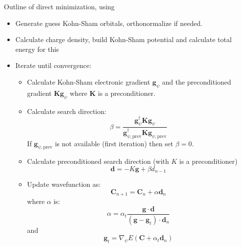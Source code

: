 Outline of direct minimization, using 
\begin{itemize}
\item Generate guess Kohn-Sham orbitals, orthonormalize if needed.
\item Calculate charge density, build Kohn-Sham potential and calculate total energy
for this
\item Iterate until convergence:
%
\begin{itemize}
%
\item Calculate Kohn-Sham electronic gradient $\mathbf{g}_{\psi}$ and the preconditioned
gradient $\mathbf{Kg}_{\psi}$ where $\mathbf{K}$ is a preconditioner.
%
\item Calculate search direction:
\begin{equation}
\beta = \dfrac{\mathbf{g}_{\psi}^{\dagger}\mathbf{Kg}_{\psi}}
{\mathbf{g}_{\psi,\mathrm{prev}}^{\dagger}\mathbf{Kg}_{\psi,\mathrm{prev}}}
\end{equation}
If $\mathbf{g}_{\psi,\mathrm{prev}}$ is not available (first iteration) then set
$\beta = 0$.
%
\item Calculate preconditioned search direction (with $K$ is a preconditioner)
\begin{equation}
\mathbf{d} = -K\mathbf{g} + \beta d_{n-1}
\end{equation}
%
\item Update wavefunction as:
\begin{equation}
\mathbf{C}_{n+1} = \mathbf{C}_{n} + \alpha \mathbf{d}_{n}
\end{equation}
where $\alpha$ is:
\begin{equation}
\alpha = \alpha_{t}\frac{\mathbf{g}\cdot\mathbf{d}}
{\left(\mathbf{g}-\mathbf{g}_{t}\right)\cdot\mathbf{d}_{n}}
\end{equation}
and
\begin{equation}
\mathbf{g}_{t} = \nabla_{\psi}E\left(\mathbf{C} + \alpha_{t}\mathbf{d}_{n}\right)
\end{equation}
\end{itemize}
%
\end{itemize}

